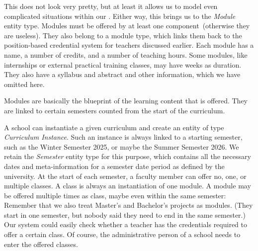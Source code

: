 \emph{}

This does not look very pretty, but at least it allows us to model even complicated situations within our \db.
Either way, this brings us to the \emph{Module} entity type.
Modules must be offered by at least one component~(otherwise they are useless).
They also belong to a module type, which links them back to the position-based credential system for teachers discussed earlier.
Each module has a name, a number of credits, and a number of teaching hours.
Some modules, like internships or external practical training classes, may have weeks as duration.
They also have a syllabus and abstract and other information, which we have omitted here.

Modules are basically the blueprint of the learning content that is offered.
They are linked to certain semesters counted from the start of the curriculum.

A school can instantiate a given curriculum and create an entity of type \emph{Curriculum Instance}.
Such an instance is always linked to a starting semester, such as the Winter Semester 2025, or maybe the Summer Semester 2026.
We retain the \emph{Semester} entity type for this purpose, which contains all the necessary dates and meta-information for a semester date period as defined by the university.
At the start of each semester, a faculty member can offer no, one, or multiple classes.
A class is always an instantiation of one module.
A module may be offered multiple times as class, maybe even within the same semester:
Remember that we also treat Master's and Bachelor's projects as modules.
(They start in one semester, but nobody said they need to end in the same semester.)
Our system could easily check whether a teacher has the credentials required to offer a certain class.
Of course, the administrative person of a school needs to enter the offered classes.


